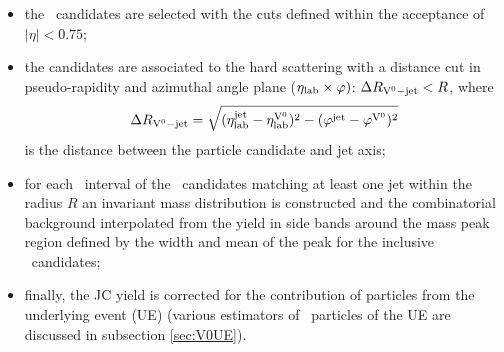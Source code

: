 \begin{itemize}
\item the \Vzero\ candidates are selected with the cuts defined within the acceptance of $|\eta|<0.75$;
\item the candidates are associated to the hard scattering with a distance cut in pseudo-rapidity and azimuthal angle plane ($\eta_{\rm lab} \times \varphi)$: $\Delta R_{{\rm V}^{0}-{\rm jet}}<R$, where
\begin{equation}
\Delta R_{{\rm V}^{0}-{\rm jet}}=\sqrt{(\eta_{\rm lab}^{\rm jet} - \eta_{\rm lab}^{{\rm V}^{0}})^{2} - (\varphi^{\rm jet} - \varphi^{{\rm V}^{0}})^{2}}
\end{equation}
is the distance between the particle candidate and jet axis;
\item for each \pt\ interval of the \Vzero\ candidates matching at least one jet within the radius $R$ an invariant mass distribution  is constructed and the combinatorial background interpolated from the yield in side bands around the mass peak region defined by the width and mean of the peak for the inclusive \Vzero\ candidates;
\item finally, the JC yield is corrected for the contribution of particles from the underlying event (UE) (various estimators of \Vzero\ particles of the UE are discussed in subsection \ref{sec:V0UE}).
\end{itemize}



